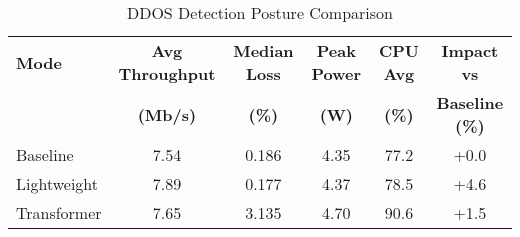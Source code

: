 \begin{table}[htbp]
\centering
\caption{DDOS Detection Posture Comparison}
\label{tab:ddos_comparison}
\begin{tabular}{@{}lccccc@{}}
\toprule
\textbf{Mode} & \textbf{Avg Throughput} & \textbf{Median Loss} & \textbf{Peak Power} & \textbf{CPU Avg} & \textbf{Impact vs} \\
 & \textbf{(Mb/s)} & \textbf{(\%)} & \textbf{(W)} & \textbf{(\%)} & \textbf{Baseline (\%)} \\
\midrule
Baseline & 7.54 & 0.186 & 4.35 & 77.2 & +0.0 \\
Lightweight & 7.89 & 0.177 & 4.37 & 78.5 & +4.6 \\
Transformer & 7.65 & 3.135 & 4.70 & 90.6 & +1.5 \\
\bottomrule
\end{tabular}
\end{table}
